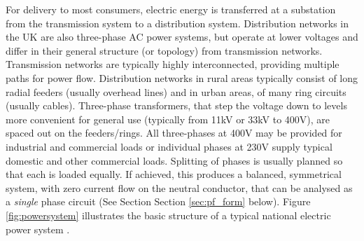 
For delivery to most consumers, electric energy is transferred at a substation
from the transmission system to a distribution system.
Distribution networks in the UK are also three-phase AC power systems, but
operate at lower voltages and differ in their general structure (or
topology) from transmission networks.  Transmission networks are typically
highly interconnected, providing multiple paths for power flow. Distribution
networks in rural areas typically consist of long radial feeders (usually
overhead lines) and in urban areas, of many ring circuits (usually cables).
Three-phase transformers, that step the voltage down to levels more convenient
for general use (typically from 11kV or 33kV to 400V), are spaced out on the
feeders/rings. All three-phases at 400V may be provided for industrial and
commercial loads or individual phases at 230V supply typical domestic and other
commercial loads. Splitting of phases is usually planned so that each is loaded
equally. If achieved, this produces a balanced, symmetrical system, with zero
current flow on the neutral conductor, that can be analysed as a
\textit{single} phase circuit (See Section Section \ref{sec:pf_form} below).  Figure
\ref{fig:powersystem} illustrates the basic structure of a typical national
electric power system \cite{blackout04}.

